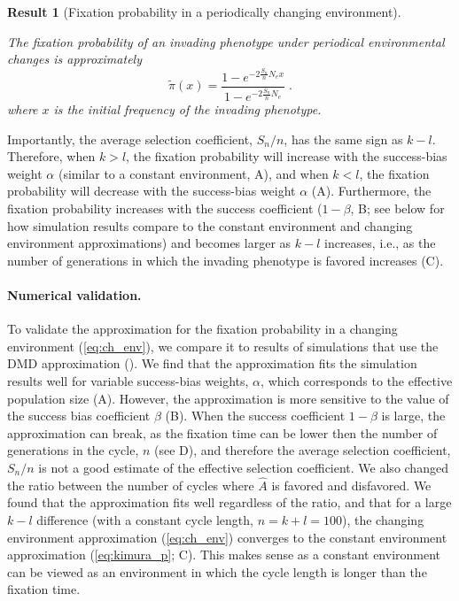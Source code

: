 \documentclass[12pt]{extarticle}
\newtheorem{result}{Result}
\begin{document}
\begin{result}[Fixation probability in a periodically changing environment]\label{res:ch_expected}

The fixation probability of an invading phenotype under periodical environmental changes is approximately
\begin{equation}\label{eq:ch_env}
\tilde\pi(x) = \frac{1-e^{-2 \frac{S_n}{n} N_e x}}{1-e^{-2 \frac{S_n}{n} N_e}} \;.
\end{equation}
where $x$ is the initial frequency of the invading phenotype.
\end{result}

Importantly, the average selection coefficient, $S_n/n$, has the same sign as $k-l$. Therefore, when $k>l$, the fixation probability will increase with the success-bias weight $\alpha$ (similar to a constant environment, A), and when $k<l$, the fixation probability will decrease with the success-bias weight $\alpha$ (A).
Furthermore, the fixation probability increases with the success coefficient ($1-\beta$, B; see below for how simulation results compare to the constant environment and changing environment approximations) and becomes larger as $k-l$ increases, i.e., as the number of generations in which the invading phenotype is favored increases (C).

\paragraph{Numerical validation.}
To validate the approximation for the fixation probability in a changing environment (\cref{eq:ch_env}), we compare it to results of simulations that use the DMD approximation ().
We find that the approximation fits the simulation results well for variable success-bias weights, $\alpha$, which corresponds to the effective population size (A).
However, the approximation is more sensitive to the value of the success bias coefficient $\beta$ (B).
When the success coefficient $1-\beta$ is large, the approximation can break, as the fixation time can be lower then the number of generations in the cycle, $n$ (see D), and therefore the average selection coefficient, $S_n/n$ is not a good estimate of the effective selection coefficient.
We also changed the ratio between the number of cycles where $\hat{A}$ is favored and disfavored. We found that the approximation fits well regardless of the ratio, and that for a large $k-l$ difference (with a constant cycle length, $n=k+l=100$), the changing environment approximation (\cref{eq:ch_env}) converges to the constant environment approximation (\cref{eq:kimura_p}; C). This makes sense as a constant environment can be viewed as an environment in which the cycle length is longer than the fixation time.
\end{document}
